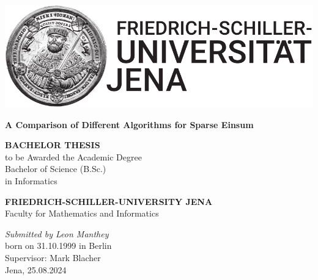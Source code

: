 \documentclass[12pt]{scrbook}
\begin{document}
\begin{titlepage}
    \begin{center}

        \begin{spacing}{1.5}
            \includegraphics[scale=0.9]{Bildmarke_black_15cm-eps-converted-to.pdf}
            \vspace*{\fill}
        \end{spacing}
        \begin{spacing}{2.5}
            \textbf{\huge A Comparison of Different Algorithms for Sparse Einsum}\\[0.5cm]
            \vspace*{\fill}
            \begin{spacing}{1.5}
                \textbf{BACHELOR THESIS\\}
                to be Awarded the Academic Degree\\
                Bachelor of Science (B.Sc.)\\
                in Informatics\\
            \end{spacing}
        \end{spacing}

        \vspace*{\fill}

        \begin{spacing}{1.15}
            \textbf{FRIEDRICH-SCHILLER-UNIVERSITY JENA\\}
            Faculty for Mathematics and Informatics

            \vspace*{\fill}

            \textit{Submitted by Leon Manthey}\\
            born on 31.10.1999 in Berlin\\
            Supervisor: Mark Blacher\\
            Jena, 25.08.2024

        \end{spacing}
    \end{center}
\end{titlepage}
\cleardoublepage
\end{document}
